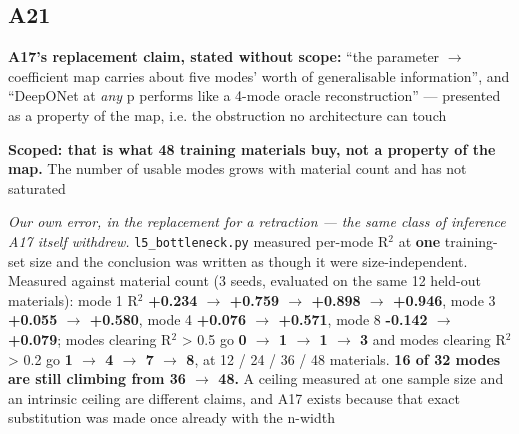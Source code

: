 \documentclass[10pt]{article}
\begin{document}
\subsection*{A21}\label{led:A21}
\begin{description}[leftmargin=0pt,itemsep=1pt]
\item[Claim withdrawn.] \textbf{A17's replacement claim, stated without scope:} ``the parameter $\rightarrow$ coefficient map carries about five modes' worth of generalisable information'', and ``DeepONet at \emph{any} p performs like a 4-mode oracle reconstruction'' --- presented as a property of the map, i.e. the obstruction no architecture can touch
\item[Replaced with.] \textbf{Scoped: that is what 48 training materials buy, not a property of the map.} The number of usable modes grows with material count and has not saturated
\item[Why it was wrong.] \emph{Our own error, in the replacement for a retraction --- the same class of inference A17 itself withdrew.} \texttt{l5\_bottleneck.py} measured per-mode R$^2$ at \textbf{one} training-set size and the conclusion was written as though it were size-independent. Measured against material count (3 seeds, evaluated on the same 12 held-out materials): mode 1 R$^2$ \textbf{+0.234 $\rightarrow$ +0.759 $\rightarrow$ +0.898 $\rightarrow$ +0.946}, mode 3 \textbf{+0.055 $\rightarrow$ +0.580}, mode 4 \textbf{+0.076 $\rightarrow$ +0.571}, mode 8 \textbf{-0.142 $\rightarrow$ +0.079}; modes clearing R$^2$ > 0.5 go \textbf{0 $\rightarrow$ 1 $\rightarrow$ 1 $\rightarrow$ 3} and modes clearing R$^2$ > 0.2 go \textbf{1 $\rightarrow$ 4 $\rightarrow$ 7 $\rightarrow$ 8}, at 12 / 24 / 36 / 48 materials. \textbf{16 of 32 modes are still climbing from 36 $\rightarrow$ 48.} A ceiling measured at one sample size and an intrinsic ceiling are different claims, and A17 exists because that exact substitution was made once already with the n-width
\end{description}
\end{document}
